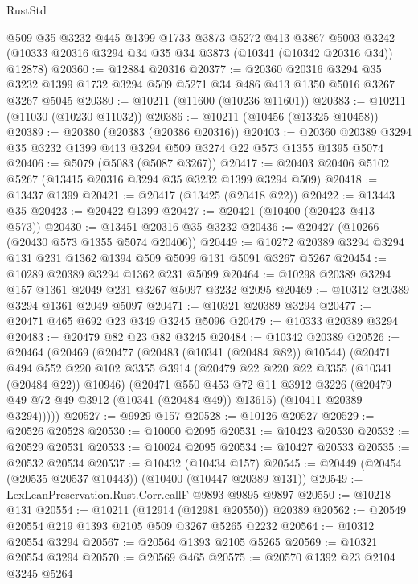 \begin{lexlean}{RustStd}
\begin{coremodule}
{\begin{coremodule}
{{{{{{{{{{{{{{{{{{{{{{{{{    @509
    @35
    @3232
    @445
    @1399
    @1733
    @3873
    @5272
    @413
    @3867
    @5003
    @3242
    (@10333 @20316 @3294 @34 @35 @34 @3873 (@10341 (@10342 @20316 @34)) @12878)
@20360 := @12884 @20316
@20377 := @20360
    @20316
    @3294
    @35
    @3232
    @1399
    @1732
    @3294
    @509
    @5271
    @34
    @486
    @413
    @1350
    @5016
    @3267
    @3267
    @5045
@20380 := @10211 (@11600 (@10236 @11601))
@20383 := @10211 (@11030 (@10230 @11032))
@20386 := @10211 (@10456 (@13325 @10458))
@20389 := @20380 (@20383 (@20386 @20316))
@20403 := @20360 @20389 @3294 @35 @3232 @1399 @413 @3294 @509 @3274 @22 @573 @1355 @1395 @5074
@20406 := @5079 (@5083 (@5087 @3267))
@20417 := @20403 @20406 @5102 @5267 (@13415 @20316 @3294 @35 @3232 @1399 @3294 @509)
@20418 := @13437 @1399
@20421 := @20417 (@13425 (@20418 @22))
@20422 := @13443 @35
@20423 := @20422 @1399
@20427 := @20421 (@10400 (@20423 @413 @573))
@20430 := @13451 @20316 @35 @3232
@20436 := @20427 (@10266 (@20430 @573 @1355 @5074 @20406))
@20449 := @10272 @20389 @3294 @3294 @131 @231 @1362 @1394 @509 @5099 @131 @5091 @3267 @5267
@20454 := @10289 @20389 @3294 @1362 @231 @5099
@20464 := @10298 @20389 @3294 @157 @1361 @2049 @231 @3267 @5097 @3232 @2095
@20469 := @10312 @20389 @3294 @1361 @2049 @5097
@20471 := @10321 @20389 @3294
@20477 := @20471 @465 @692 @23 @349 @3245 @5096
@20479 := @10333 @20389 @3294
@20483 := @20479 @82 @23 @82 @3245
@20484 := @10342 @20389
@20526 := @20464
    (@20469
      (@20477
        (@20483 (@10341 (@20484 @82)) @10544)
        (@20471
          @494
          @552
          @220
          @102
          @3355
          @3914
          (@20479 @22 @220 @22 @3355 (@10341 (@20484 @22)) @10946)
          (@20471
            @550
            @453
            @72
            @11
            @3912
            @3226
            (@20479 @49 @72 @49 @3912 (@10341 (@20484 @49)) @13615)
            (@10411 @20389 @3294)))))
@20527 := @9929 @157
@20528 := @10126 @20527
@20529 := @20526 @20528
@20530 := @10000 @2095
@20531 := @10423 @20530
@20532 := @20529 @20531
@20533 := @10024 @2095
@20534 := @10427 @20533
@20535 := @20532 @20534
@20537 := @10432 (@10434 @157)
@20545 := @20449 (@20454 (@20535 @20537 @10443)) (@10400 (@10447 @20389 @131))
@20549 := LexLeanPreservation.Rust.Corr.callF @9893 @9895 @9897
@20550 := @10218 @131
@20554 := @10211 (@12914 (@12981 @20550)) @20389
@20562 := @20549 @20554 @219 @1393 @2105 @509 @3267 @5265 @2232
@20564 := @10312 @20554 @3294
@20567 := @20564 @1393 @2105 @5265
@20569 := @10321 @20554 @3294
@20570 := @20569 @465
@20575 := @20570 @1392 @23 @2104 @3245 @5264
}}}}}}}}}}}}}}}}}}}}}}}}}
\end{coremodule}}
\end{coremodule}
\end{lexlean}
